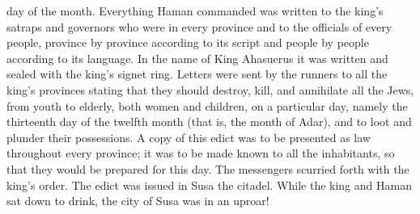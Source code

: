 {day
of the month. Everything
Haman
commanded
was written
to
the king’s
satraps
and governors
who
were in
every
province
and to
the officials
of every
people,
province
by province
according to its script
and people
by people
according to its language.
In the name
of King
Ahasuerus
it was written
and sealed
with the king’s
signet ring.
Letters
were sent
by
the runners
to
all
the king’s
provinces
stating that they should destroy,
kill,
and annihilate
all
the Jews,
from
youth
to elderly,
both
women
and children,
on a
particular day,
namely the thirteenth
day of the twelfth
month
(that
is, the month
of Adar), and to loot
and plunder their possessions.
A copy
of this edict
was to be presented
as law
throughout
every
province;
it was to be made known
to all
the inhabitants,
so that they would be
prepared
for this
day.
The messengers
scurried
forth
with the king’s
order. The edict
was issued
in Susa
the citadel.
While the king
and Haman
sat
down to drink,
the city
of Susa
was in an uproar!

}
